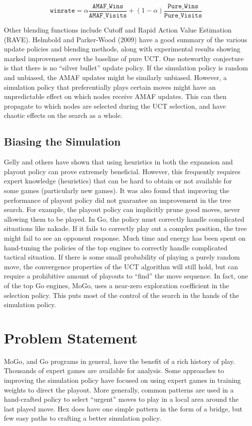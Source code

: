 \documentclass[11pt]{report}
\begin{document}
\[
\texttt{winrate} = \alpha\frac{\texttt{AMAF\_Wins}}{\texttt{AMAF\_Visits}} + (1 - \alpha)\frac{\texttt{Pure\_Wins}}{\texttt{Pure\_Visits}}
\]

Other blending functions include Cutoff and Rapid Action Value Estimation (RAVE). Helmbold and Parker-Wood (2009) have a good summary of the various update policies and blending methods, along with experimental results showing marked improvement over the baseline of pure UCT\cite{helmbold2009all}. One noteworthy conjecture is that there is no ``silver bullet'' update policy. If the simulation policy is random and unbiased, the AMAF updates might be similarly unbiased. However, a simulation policy that preferentially plays certain moves might have an unpredictable effect on which nodes receive AMAF updates. This can then propagate to which nodes are selected during the UCT selection, and have chaotic effects on the search as a whole. 

\subsection{Biasing the Simulation}\label{bias}
Gelly and others have shown that using heuristics in both the expansion and playout policy can prove extremely beneficial\cite{gelly2006modification}\cite{gelly2008achieving}. However, this frequently requires expert knowledge (heuristics) that can be hard to obtain or not available for some games (particularly new games). It was also found that improving the performance of playout policy did not guarantee an improvement in the tree search. For example, the playout policy can implicitly prune good moves, never allowing them to be played. In Go, the policy must correctly handle complicated situations like nakade. If it fails to correctly play out a complex position, the tree might fail to see an opponent response. Much time and energy has been spent on hand-tuning the policies of the top engines to correctly handle complicated tactical situation. If there is some small probability of playing a purely random move, the convergence properties of the UCT algorithm will still hold, but can require a prohibitive amount of playouts to ``find'' the move sequence. In fact, one of the top Go engines, MoGo, uses a near-zero exploration coefficient in the selection policy\cite{gelly2007combining}. This puts most of the control of the search in the hands of the simulation policy.

\section{Problem Statement}\label{problem}
MoGo, and Go programs in general, have the benefit of a rich history of play. Thousands of expert games are available for analysis. Some approaches to improving the simulation policy have focused on using expert games in training weights to direct the playout\cite{chaslot2010adding}. More generally, common patterns are used in a hand-crafted policy to select ``urgent'' moves to play in a local area around the last played move. Hex does have one simple pattern in the form of a bridge\cite{anshelevich2002hierarchical}, but few easy paths to crafting a better simulation policy.
\end{document}

